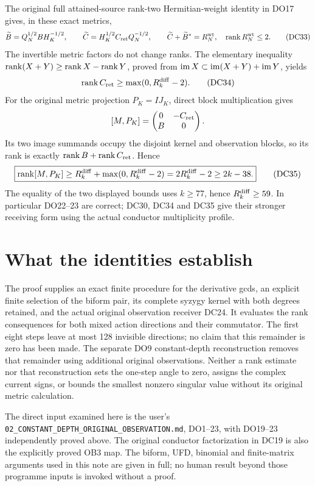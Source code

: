The original full attained-source rank-two Hermitian-weight identity
in DO17 gives, in these exact metrics,
\[
 \widetilde B=Q_N^{1/2}BH_K^{-1/2},\qquad
 \widetilde C=H_K^{1/2}C_{\rm ret}Q_N^{-1/2},\qquad
 \widetilde C+\widetilde B^*=R_N^{\rm wt},\quad
 \operatorname{rank} R_N^{\rm wt}\le2.                                        \tag{DC33}
\]
The invertible metric factors do not change ranks.  The elementary
inequality $\operatorname{rank}(X+Y)\ge\operatorname{rank} X-\operatorname{rank} Y$, proved from
$\operatorname{im} X\subset\operatorname{im}(X+Y)+\operatorname{im} Y$, yields
\[
 \operatorname{rank} C_{\rm ret}\ge\max(0,R_k^{\rm diff}-2).                  \tag{DC34}
\]
For the original metric projection $P_K=IJ_K$, direct block
multiplication gives
\[
 [M,P_K]=\begin{pmatrix}0&-C_{\rm ret}\\B&0\end{pmatrix}.
\]
Its two image summands occupy the disjoint kernel and observation
blocks, so its rank is exactly $\operatorname{rank} B+\operatorname{rank} C_{\rm ret}$.  Hence
\[
 \boxed{\operatorname{rank}[M,P_K]\ge
 R_k^{\rm diff}+\max(0,R_k^{\rm diff}-2)
 =2R_k^{\rm diff}-2\ge2k-38.}                                   \tag{DC35}
\]
The equality of the two displayed bounds uses $k\ge77$, hence
$R_k^{\rm diff}\ge59$.  In particular DO22--23 are correct; DC30,
DC34 and DC35 give their stronger receiving form using the actual
conductor multiplicity profile.

\section{What the identities establish}
The proof supplies an exact finite procedure for the derivative gcds,
an explicit finite selection of the biform pair, its complete syzygy
kernel with both degrees retained, and the actual original observation
receiver DC24.  It evaluates the rank consequences for both mixed
action directions and their commutator.  The first eight steps leave
at most 128 invisible directions; no claim that this remainder is
zero has been made.  The separate DO9 constant-depth reconstruction
removes that remainder using additional original observations.
Neither a rank estimate nor that reconstruction sets the one-step
angle to zero, assigns the complex current signs, or bounds the
smallest nonzero singular value without its original metric calculation.

The direct input examined here is the user's
\texttt{02\_CONSTANT\_DEPTH\_ORIGINAL\_OBSERVATION.md}, DO1--23,
with DO19--23 independently proved above.  The original conductor
factorization in DC19 is also the explicitly proved OB3 map.
The biform, UFD, binomial and finite-matrix arguments used in this
note are given in full; no human result beyond those programme
inputs is invoked without a proof.

